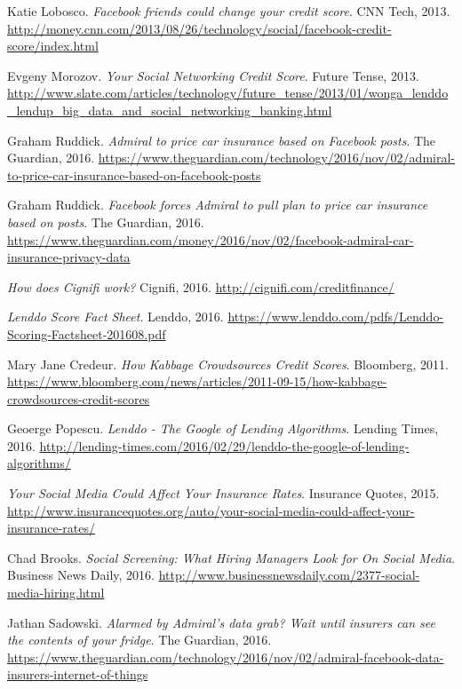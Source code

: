 \documentclass[polish]{kbk}
\begin{document}
\begin{thebibliography}{9}

  Katie Lobosco.
  \emph{Facebook friends could change your credit score}.
  CNN Tech, 2013.
  \url{http://money.cnn.com/2013/08/26/technology/social/facebook-credit-score/index.html}
  
  Evgeny Morozov.
  \emph{Your Social Networking Credit Score}.
  Future Tense, 2013.
  \url{http://www.slate.com/articles/technology/future_tense/2013/01/wonga_lenddo_lendup_big_data_and_social_networking_banking.html}
  
  Graham Ruddick.
  \emph{Admiral to price car insurance based on Facebook posts}.
  The Guardian, 2016.
  \url{https://www.theguardian.com/technology/2016/nov/02/admiral-to-price-car-insurance-based-on-facebook-posts}
  
  Graham Ruddick.
  \emph{Facebook forces Admiral to pull plan to price car insurance based on posts}.
  The Guardian, 2016.
  \url{https://www.theguardian.com/money/2016/nov/02/facebook-admiral-car-insurance-privacy-data}
  
  \emph{How does Cignifi work?}
  Cignifi, 2016.
  \url{http://cignifi.com/creditfinance/}
  
  \emph{Lenddo Score Fact Sheet}.
  Lenddo, 2016.
  \url{https://www.lenddo.com/pdfs/Lenddo-Scoring-Factsheet-201608.pdf}
  
  Mary Jane Credeur.
  \emph{How Kabbage Crowdsources Credit Scores}.
  Bloomberg, 2011.
  \url{https://www.bloomberg.com/news/articles/2011-09-15/how-kabbage-crowdsources-credit-scores}
  
  Geoerge Popescu.
  \emph{Lenddo - The Google of Lending Algorithms}.
  Lending Times, 2016.
  \url{http://lending-times.com/2016/02/29/lenddo-the-google-of-lending-algorithms/}
  
  \emph{Your Social Media Could Affect Your Insurance Rates}.
  Insurance Quotes, 2015.
  \url{http://www.insurancequotes.org/auto/your-social-media-could-affect-your-insurance-rates/}
  
  Chad Brooks.
  \emph{Social Screening: What Hiring Managers Look for On Social Media}.
  Business News Daily, 2016.
  \url{http://www.businessnewsdaily.com/2377-social-media-hiring.html}
  
  Jathan Sadowski.
  \emph{Alarmed by Admiral's data grab? Wait until insurers can see the contents of your fridge}.
  The Guardian, 2016.
  \url{https://www.theguardian.com/technology/2016/nov/02/admiral-facebook-data-insurers-internet-of-things}
  

\end{thebibliography}
\end{document}
